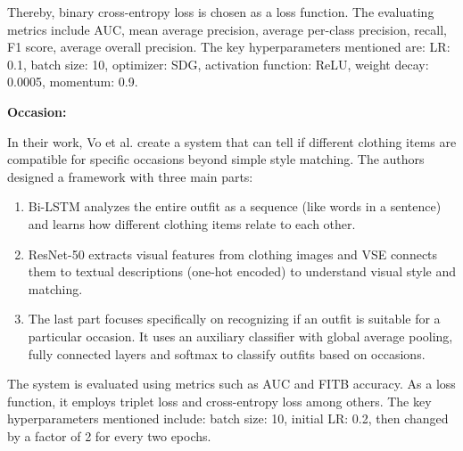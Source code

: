 Thereby, binary cross-entropy loss is chosen as a loss function. The evaluating metrics include \acs{AUC}, mean average precision, average per-class precision, recall, F1 score, average overall precision. The key hyperparameters mentioned are: \acs{LR}: 0.1, batch size: 10, optimizer: SDG, activation function: \acs{ReLU}, weight decay: 0.0005, momentum: 0.9. \cite[cf.]{pang_learning_2024}

\vspace{0.5cm}

\textbf{Occasion:}

\vspace{0.5cm}

In their work, Vo et al. create a system that can tell if different clothing items are compatible for specific occasions beyond simple style matching. The authors designed a framework with three main parts: \cite[cf.]{vo_efficient_2023}

\begin{enumerate}
  \item \acs{Bi-LSTM} analyzes the entire outfit as a sequence (like words in a sentence) and learns how different clothing items relate to each other.
  \item \acs{ResNet}-50 extracts visual features from clothing images and \acs{VSE} connects them to textual descriptions (one-hot encoded) to understand visual style and matching.
  \item The last part focuses specifically on recognizing if an outfit is suitable for a particular occasion. It uses an auxiliary classifier with global average pooling, fully connected layers and softmax to classify outfits based on occasions.
\end{enumerate}

The system is evaluated using metrics such as \acs{AUC} and \acs{FITB} accuracy. As a loss function, it employs triplet loss and cross-entropy loss among others. The key hyperparameters mentioned include: batch size: 10, initial \acs{LR}: 0.2, then changed by a factor of 2 for every two epochs. \cite[cf.]{vo_efficient_2023}
